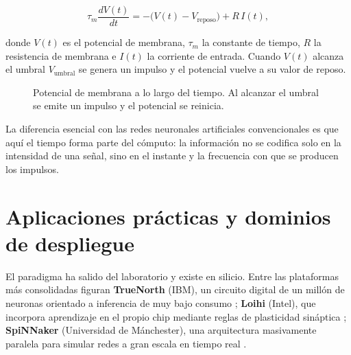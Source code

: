 \documentclass[a4paper,11pt,oneside]{book}
\begin{document}
\begin{equation}
\tau_m \frac{dV(t)}{dt} = -\bigl(V(t) - V_{\mathrm{reposo}}\bigr) + R\, I(t),
\label{eq:lif}
\end{equation}

donde $V(t)$ es el potencial de membrana, $\tau_m$ la constante de tiempo, $R$ la
resistencia de membrana e $I(t)$ la corriente de entrada. Cuando $V(t)$ alcanza
el umbral $V_{\mathrm{umbral}}$ se genera un impulso y el potencial vuelve a su
valor de reposo.

\begin{figure}[H]
\centering
{}
\caption{Potencial de membrana a lo largo del tiempo. Al alcanzar el umbral se
emite un impulso y el potencial se reinicia.}
\label{fig:neurona}
\end{figure}

La diferencia esencial con las redes neuronales artificiales convencionales es que
aquí el tiempo forma parte del cómputo: la información no se codifica solo en la
intensidad de una señal, sino en el instante y la frecuencia con que se producen
los impulsos.

\section{Aplicaciones prácticas y dominios de despliegue}
\label{sec:aplicaciones}

El paradigma ha salido del laboratorio y existe en silicio. Entre las
plataformas más consolidadas figuran \textbf{TrueNorth} (IBM), un circuito
digital de un millón de neuronas orientado a inferencia de muy bajo consumo
\parencite{merolla2014}; \textbf{Loihi} (Intel), que incorpora aprendizaje en el
propio chip mediante reglas de plasticidad sináptica \parencite{davies2018};
\textbf{SpiNNaker} (Universidad de Mánchester), una arquitectura masivamente
paralela para simular redes a gran escala en tiempo real \parencite{furber2014}.
\end{document}
